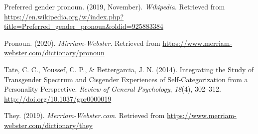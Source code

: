 \documentclass[12pt,twoside]{reedthesis}
\begin{document}
\hypertarget{ref-noauthor_preferred_2019}{}
Preferred gender pronoun. (2019, November). \emph{Wikipedia}. Retrieved
from
\url{https://en.wikipedia.org/w/index.php?title=Preferred_gender_pronoun\&oldid=925883384}

\hypertarget{ref-noauthor_pronoun_2020}{}
Pronoun. (2020). \emph{Mirriam-Webster}. Retrieved from
\url{https://www.merriam-webster.com/dictionary/pronoun}

\hypertarget{ref-tate_integrating_2014}{}
Tate, C. C., Youssef, C. P., \& Bettergarcia, J. N. (2014). Integrating
the Study of Transgender Spectrum and Cisgender Experiences of
Self-Categorization from a Personality Perspective. \emph{Review of
General Psychology}, \emph{18}(4), 302--312.
\url{http://doi.org/10.1037/gpr0000019}

\hypertarget{ref-noauthor_they_2019}{}
They. (2019). \emph{Merriam-Webster.com}. Retrieved from
\url{https://www.merriam-webster.com/dictionary/they}


\end{document}
